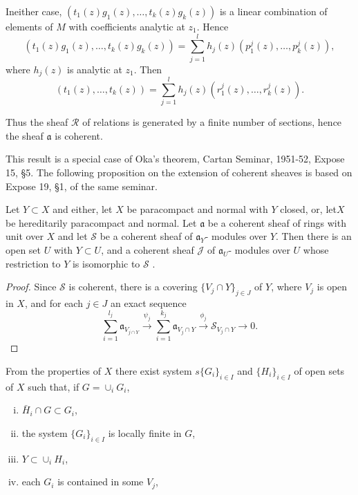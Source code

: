 In\pageoriginale either case, $(t_1(z)g_1(z), \ldots, t_k(z) g_k (z))$ is a linear
combination of elements of $M$ with coefficients analytic at
$z_1$. Hence  
$$
(t_1(z)g_1(z), \ldots, t_k(z) g_k (z))= \sum^l_{j=1}h_j(z) 
(p^j_1(z), \ldots, p^j_k(z)), 
$$
where $h_j(z)$ is analytic at $z_1$. Then 
$$
(t_1(z), \ldots , t_k(z))= \sum^l_{j=1}h_j(z) (r^j_1(z), \ldots, 
r^j_k(z)). 
$$

Thus the sheaf $\mathscr{R}$ of relations is generated by a finite
number of sections, hence the sheaf $\mathfrak{a}$ is coherent. 

This result is a special case of Oka's theorem, Cartan Seminar,
1951-52, Expose 15, \S 5. The following proposition on the
extension of coherent sheaves is based on Expose 19, \S 1, of the
same seminar. 

\begin{proposition}%
 Let $Y \subset X$ and either, let $X$ be paracompact and normal
  with $Y$ closed, or, let$X$ be hereditarily paracompact and normal.
  Let $\mathfrak{a}$ be a coherent sheaf of rings with unit over $X$
  and let $\mathscr{S}$ be a coherent sheaf of $\mathfrak{a}_Y$-
  modules over $Y$. Then there is an open set $U$ with $Y \subset U$,
  and a coherent sheaf $\mathcal{J}$ of $\mathfrak{a}_U$- modules over
  $U$ whose restriction to $Y$ is isomorphic to  $\mathscr{S}$ .   
\end{proposition}

\begin{proof}
Since $\mathscr{S}$ is coherent, there is a covering $\{ V_j \cap Y
\}_{ j \in J}$ of $Y$, where $V_j$ is open in $X$, and for each $j \in
J$ an exact sequence  
$$ 
\sum^{l_j}_{i=1} \mathfrak{a}_{V_{j \cap Y}} \xrightarrow{\psi_j}
\sum^{k_j}_{i=1} \mathfrak{a}_{V_j \cap Y} \xrightarrow{\phi_j} \mathscr{S}_{V_j
  \cap Y} \to 0. 
$$
\end{proof}\pageoriginale

From the properties of $X$ there exist system $s\{ G_i\}_{i \in I}$ and
$\{ H_i \}_{i \in I}$ of open sets of $X$ such that, if $G=\cup_{i}G_i$,
 \begin{enumerate}[(i)]
\item $\bar{H}_i \cap G \subset G_i$,

\item the system $\{ G_i\}_{i \in I}$ is locally finite in $G$,  

\item $Y \subset \cup_i H_i$,

\item each $G_i$ is contained in some $V_j$, 
\end{enumerate}

